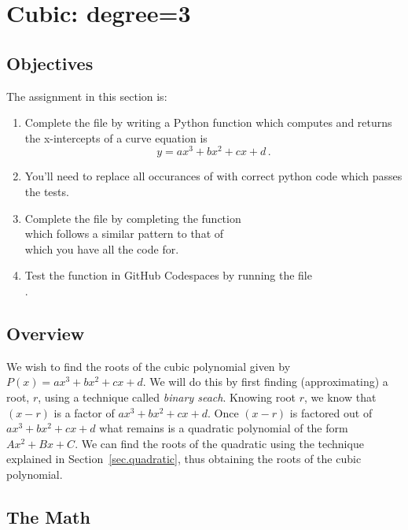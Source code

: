 \section{Cubic: degree=3}
\label{sec.cubic}

\subsection{Objectives}
The assignment in this section is:
\begin{enumerate}
\item Complete the file  by writing a Python
  function which computes and returns the x-intercepts of a curve
  equation is \[y=a x^3 + b x^2 + c x + d\,.\]
\item You'll need to replace all occurances of 
  with correct python code which passes the tests.

\item Complete the file  by completing the function \\
  which follows a similar pattern to that of \\
   which you have all the code for.

\item Test the function in GitHub Codespaces by running the file\\
  .
\end{enumerate}

\subsection{Overview}

We wish to find the roots of the cubic polynomial given by $P(x) = a
x^3 + b x^2 + c x + d$.  We will do this by first finding
(approximating) a root, $r$, using a technique called \emph{binary
seach}.  Knowing root $r$, we know that $(x-r)$ is a factor of $a x^3
+ b x^2 + c x + d$.  Once $(x-r)$ is factored out of $a x^3 + b x^2 + c x + d$
what remains is a quadratic polynomial of the form $A x^2 + Bx + C$.
We can find the roots of the quadratic using the technique
explained in Section~\ref{sec.quadratic}, thus obtaining the roots of
the cubic polynomial.


\subsection{The Math}

